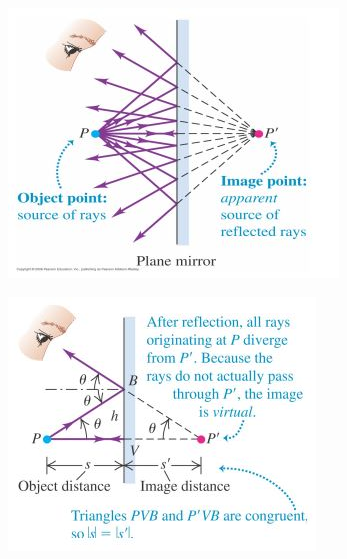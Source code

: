 \documentclass[a4paper, 11pt, fleqn, normalem]{report}
\begin{document}
\begin{figure}[H]
    \begin{subfigure}{0.4\textwidth}
        \includegraphics[width=\textwidth]{Mirror1.jpg}
    \end{subfigure}
    \begin{subfigure}{0.4\textwidth}
        \includegraphics[width=\textwidth]{Mirror2.jpg}
    \end{subfigure}
\end{figure}
\end{document}
